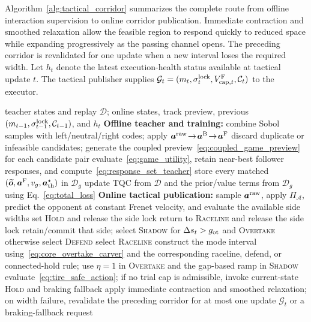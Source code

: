 \documentclass[journal,twoside,web]{ieeecolor}
\begin{document}
Algorithm~\ref{alg:tactical_corridor} summarizes the complete route from
offline interaction supervision to online corridor publication. Immediate
contraction and smoothed relaxation allow the feasible region to respond
quickly to reduced space while expanding progressively as the passing channel
opens. The preceding corridor is revalidated for one update when a new
interval loses the required width.
Let $h_t$ denote the latest execution-health status available at tactical
update $t$. The tactical publisher supplies
$\mathcal G_t=(m_t,\sigma_t^{\rm lock},V_{{\rm cap},t}^{\rm F},\mathcal C_t)$
to the executor.

\begin{algorithm}[!tbp]
\caption{Game-supervised tactical-corridor policy}
\label{alg:tactical_corridor}
\footnotesize
\begin{algorithmic}[1]
\REQUIRE teacher states and replay $\mathcal D$; online states, track preview,
previous $(m_{t-1},\sigma_{t-1}^{\rm lock},\mathcal C_{t-1})$, and $h_t$
\STATE \textbf{Offline teacher and training:}
\STATE combine Sobol samples with left/neutral/right codes; apply
$\bm a^{\rm raw}\!\rightarrow\!\bm a^{\rm B}\!\rightarrow\!\bm a^{\rm F}$
\STATE discard duplicate or infeasible candidates; generate the coupled
preview~\eqref{eq:coupled_game_preview} for each candidate pair
\STATE evaluate~\eqref{eq:game_utility}, retain near-best follower responses,
and compute~\eqref{eq:response_set_teacher}
\STATE store every matched
$(\widetilde{\bm o},\bm a^{\rm F},v_g,\bm a_{\rm th}^{\star})$
in $\mathcal D_g$
\ENDFOR
\STATE update TQC from $\mathcal D$ and the prior/value terms from $\mathcal D_g$
using Eq.~\eqref{eq:total_loss}
\STATE \textbf{Online tactical publication:}
\STATE sample $\bm a^{\rm raw}$, apply $\Pi_{\mathcal A}$, predict the opponent
at constant Frenet velocity, and evaluate the available side widths
\STATE set \textsc{Hold} and release the side lock
\STATE return to \textsc{Raceline} and release the side lock
\STATE retain/commit that side; select \textsc{Shadow} for $\Delta s_t>g_{\rm ot}$
and \textsc{Overtake} otherwise
\STATE select \textsc{Defend}
\ELSE
\STATE select \textsc{Raceline}
\ENDIF
\STATE construct the mode interval using~\eqref{eq:core_overtake_carver} and
the corresponding raceline, defend, or connected-hold rule; use
$\eta=1$ in \textsc{Overtake} and the gap-based ramp in \textsc{Shadow}
\STATE evaluate~\eqref{eq:tire_safe_action}; if no trial cap is admissible,
invoke current-state \textsc{Hold} and braking fallback
\STATE apply immediate contraction and smoothed relaxation; on width failure,
revalidate the preceding corridor for at most one update
\RETURN $\mathcal G_t$ or a braking-fallback request
\end{algorithmic}
\end{algorithm}
\end{document}
